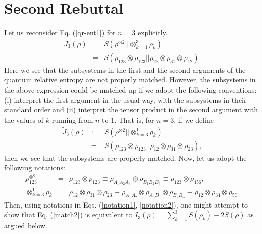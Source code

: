 \documentclass[aps,onecolumn,qic,superscriptaddress,11pt]{revtex4-1}
\begin{document}
\section{Second Rebuttal}
Let us reconsider Eq. (\ref{qr-ent1}) for $n=3$ explicitly.
\begin{eqnarray}
J_3(\rho) &=& S(\rho^{\otimes 2} || \otimes^3_{k=1} \rho_{\overline{k}}) \nonumber \\ 
&=& S(\rho_{123} \otimes \rho_{123} || \rho_{23} \otimes \rho_{31} \otimes \rho_{12}). \label{match1} 
\end{eqnarray}
Here we see that the subsystems in the first and the second arguments of the quantum relative entropy are not properly matched. 
%
However, the subsystems in the above expression could be matched up if we adopt the following conventions: (i) interpret the first argument in the usual way, with the subsystems in their standard order and (ii) interpret the tensor product in the second argument with the values of $k$ running from $n$ to $1$. That is, for $n=3$, if we define 
\begin{eqnarray}
\tilde{J}_3(\rho) &:=& S(\rho^{\otimes 2} || \otimes^1_{k=3} \rho_{\overline{k}}) \nonumber \\
&=& S(\rho_{123} \otimes \rho_{123} || \rho_{12} \otimes \rho_{31} \otimes \rho_{23}), \label{match2} 
\end{eqnarray}
then we see that the subsystems are properly matched. Now, let us adopt the following notations:
\begin{eqnarray}
\rho_{123}^{\otimes 2} &=& \rho_{123} \otimes \rho_{123} 
 \equiv  \rho_{A_1A_2A_3} \otimes \rho_{B_1B_2B_3} 
 \equiv  \rho_{123} \otimes \rho_{456}, \label{notation1} \\
\otimes^1_{k=3} \rho_{\overline{k}} &=& \rho_{12} \otimes \rho_{31} \otimes \rho_{23} 
 \equiv  \rho_{A_1A_2} \otimes \rho_{A_3B_1} \otimes \rho_{B_2B_3} 
 \equiv  \rho_{12} \otimes \rho_{34} \otimes \rho_{56}. \label{notation2}
\end{eqnarray}
Then, using notations in Eqs. (\ref{notation1}, \ref{notation2}), one might attempt to show that Eq. (\ref{match2}) is equivalent to $I_3(\rho) = \sum^3_{k=1} S(\rho_{\overline{k}}) - 2 S(\rho)$ as argued below.
\end{document}
